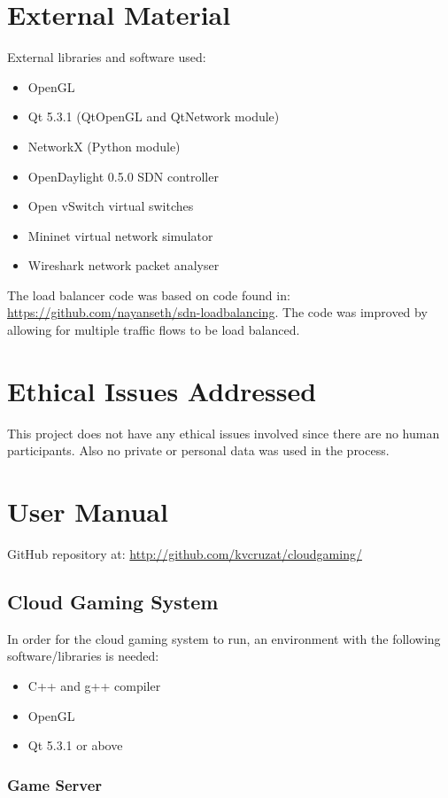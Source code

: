 \begin{appendices}
\chapter{External Material}
External libraries and software used:
\begin{itemize}
	\item OpenGL
	\item Qt 5.3.1 (QtOpenGL and QtNetwork module)
	\item NetworkX (Python module)
	\item OpenDaylight 0.5.0 SDN controller
	\item Open vSwitch virtual switches
	\item Mininet virtual network simulator
	\item Wireshark network packet analyser
\end{itemize}

The load balancer code was based on code found in: \url{https://github.com/nayanseth/sdn-loadbalancing}. The code was improved by allowing for multiple traffic flows to be load balanced.

\chapter{Ethical Issues Addressed}
This project does not have any ethical issues involved since there are no human participants. Also no private or personal data was used in the process.

\chapter{User Manual}

GitHub repository at: \url{http://github.com/kvcruzat/cloudgaming/}

\section{Cloud Gaming System}

In order for the cloud gaming system to run, an environment with the following software/libraries is needed:
\begin{itemize}
	\item C++ and g++ compiler
	\item OpenGL
	\item Qt 5.3.1 or above
\end{itemize}

\subsection{Game Server}


\end{appendices}
